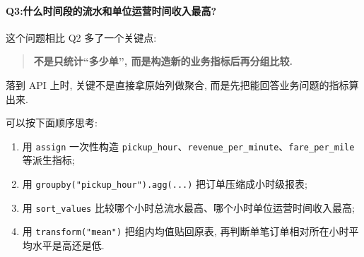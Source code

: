 \documentclass[11pt]{article}
\providecommand{\tightlist}{%
      \setlength{\itemsep}{0pt}\setlength{\parskip}{0pt}}
\begin{document}
    \paragraph{Q3:什么时间段的流水和单位运营时间收入最高?}\label{q3ux4ec0ux4e48ux65f6ux95f4ux6bb5ux7684ux6d41ux6c34ux548cux5355ux4f4dux8fd0ux8425ux65f6ux95f4ux6536ux5165ux6700ux9ad8}

    这个问题相比 Q2 多了一个关键点:

\begin{quote}
\textbf{不是只统计``多少单'', 而是构造新的业务指标后再分组比较.}
\end{quote}

落到 API 上时, 关键不是直接拿原始列做聚合,
而是先把能回答业务问题的指标算出来.

可以按下面顺序思考:

\begin{enumerate}
\def\labelenumi{\arabic{enumi}.}
\tightlist
\item
  用 \texttt{assign} 一次性构造
  \texttt{pickup\_hour}、\texttt{revenue\_per\_minute}、\texttt{fare\_per\_mile}
  等派生指标;
\item
  用 \texttt{groupby("pickup\_hour").agg(...)} 把订单压缩成小时级报表;
\item
  用 \texttt{sort\_values}
  比较哪个小时总流水最高、哪个小时单位运营时间收入最高;
\item
  用 \texttt{transform("mean")} 把组内均值贴回原表,
  再判断单笔订单相对所在小时平均水平是高还是低.
\end{enumerate}
\end{document}
